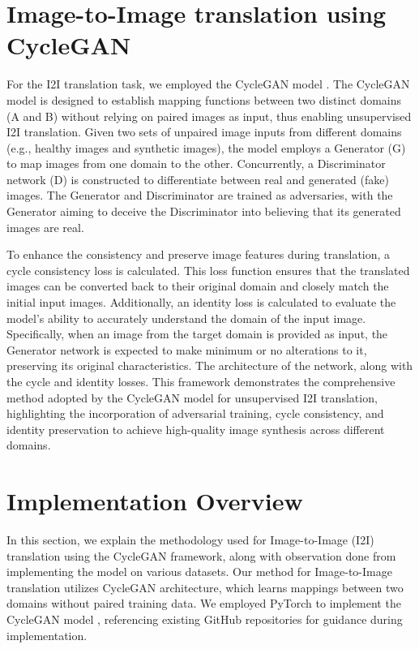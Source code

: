 \documentclass[UKenglish,12pt]{master-style}
\begin{document}
\section{Image-to-Image translation using CycleGAN}

For the I2I translation task, we employed the CycleGAN model \cite{CycleGAN}. The CycleGAN model is designed to establish mapping functions between two distinct domains (A and B) without relying on paired images as input, thus enabling unsupervised I2I translation. Given two sets of unpaired image inputs from different domains (e.g., healthy images and synthetic images), the model employs a Generator (G) to map images from one domain to the other. Concurrently, a Discriminator network (D) is constructed to differentiate between real and generated (fake) images. The Generator and Discriminator are trained as adversaries, with the Generator aiming to deceive the Discriminator into believing that its generated images are real.

To enhance the consistency and preserve image features during translation, a cycle consistency loss is calculated. This loss function \cite{CycleGAN} ensures that the translated images can be converted back to their original domain and closely match the initial input images. Additionally, an identity loss is calculated to evaluate the model's ability to accurately understand the domain of the input image. Specifically, when an image from the target domain is provided as input, the Generator network is expected to make minimum or no alterations to it, preserving its original characteristics. The architecture of the network, along with the cycle and identity losses. This framework demonstrates the comprehensive method adopted by the CycleGAN model for unsupervised I2I translation, highlighting the incorporation of adversarial training, cycle consistency, and identity preservation to achieve high-quality image synthesis across different domains.

\section*{Implementation Overview}

In this section, we explain the methodology used for Image-to-Image (I2I) translation using the CycleGAN framework, along with observation done from implementing the model on various datasets. Our method for Image-to-Image translation utilizes CycleGAN architecture, which learns mappings between two domains without paired training data. We employed PyTorch to implement the CycleGAN model \cite{CycleGAN}, referencing existing GitHub repositories for guidance during implementation.
\end{document}
